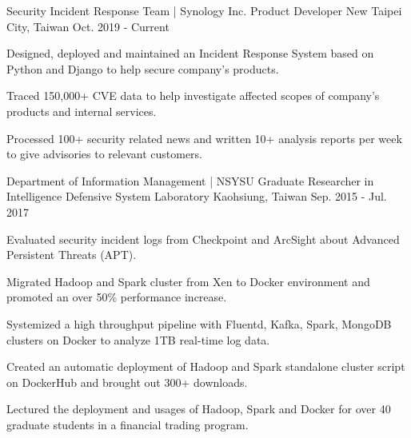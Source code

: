 


\begin{cventries}


\cventry
{Security Incident Response Team | Synology Inc.} %
{Product Developer} %
{New Taipei City, Taiwan} %
{Oct. 2019 - Current} %
{ %
\begin{cvitems}
\item {Designed, deployed and maintained an Incident Response System based on Python and Django to help secure company's products.}
\item {Traced 150,000+ CVE data to help investigate affected scopes of company's products and internal services.}
\item {Processed 100+ security related news and written 10+ analysis reports per week to give advisories to relevant customers.}
\end{cvitems}
}


\cventry
{Department of Information Management | NSYSU} %
{Graduate Researcher in Intelligence Defensive System Laboratory} %
{Kaohsiung, Taiwan} %
{Sep. 2015 - Jul. 2017} %
{ %
\begin{cvitems}
\item {Evaluated security incident logs from Checkpoint and ArcSight about Advanced Persistent Threats (APT).}
\item {Migrated Hadoop and Spark cluster from Xen to Docker environment and promoted an over 50\% performance increase.}
\item {Systemized a high throughput pipeline with Fluentd, Kafka, Spark, MongoDB clusters on Docker to analyze 1TB real-time log data.}
\item {Created an automatic deployment of Hadoop and Spark standalone cluster script on DockerHub and brought out 300+ downloads.}
\item {Lectured the deployment and usages of Hadoop, Spark and Docker for over 40 graduate students in a financial trading program.}
\end{cvitems}
}


\end{cventries}
